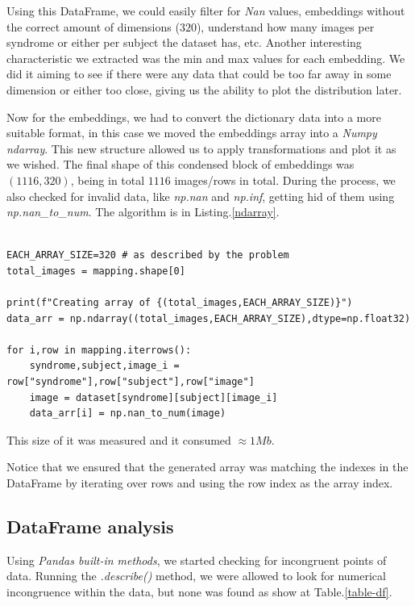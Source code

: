 \documentclass{article}
\begin{document}
Using this DataFrame, we could easily filter for \textit{Nan} values, embeddings without the correct amount of dimensions ($320$), understand how many images per syndrome or either per subject the dataset has, etc. Another interesting characteristic we extracted was the min and max values for each embedding. We did it aiming to see if there were any data that could be too far away in some dimension or either too close, giving us the ability to plot the distribution later.

Now for the embeddings, we had to convert the dictionary data into a more suitable format, in this case we moved the embeddings array into a \textit{Numpy ndarray}. This new structure allowed us to apply transformations and plot it as we wished. The final shape of this condensed block of embeddings was $(1116, 320)$, being in total $1116$ images/rows in total. During the process, we also checked for invalid data, like \textit{np.nan} and \textit{np.inf}, getting hid of them using \textit{np.nan\_to\_num}. The algorithm is in Listing.\ref{ndarray}.


\begin{listing}[H]
	\centering
	\begin{verbatim} 

EACH_ARRAY_SIZE=320 # as described by the problem
total_images = mapping.shape[0]
	
print(f"Creating array of {(total_images,EACH_ARRAY_SIZE)}")
data_arr = np.ndarray((total_images,EACH_ARRAY_SIZE),dtype=np.float32)
	
for i,row in mapping.iterrows():
	syndrome,subject,image_i = row["syndrome"],row["subject"],row["image"]
	image = dataset[syndrome][subject][image_i]
	data_arr[i] = np.nan_to_num(image)
	\end{verbatim}
	\caption{\textit{Python} the creation of a ndarray containing all images in sequence.}
	\label{ndarray}
\end{listing}

This size of it was measured and it consumed $\approx 1Mb$.

Notice that we ensured that the generated array was matching the indexes in the DataFrame by iterating over rows and using the row index as the array index.

\subsection{DataFrame analysis}

Using \textit{Pandas built-in methods}, we started checking for incongruent points of data. Running the \textit{.describe()} method, we were allowed to look for numerical incongruence within the data, but none was found as show at Table.\ref{table-df}.
\end{document}
